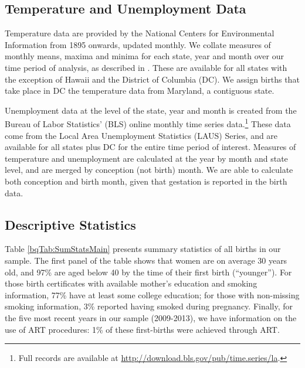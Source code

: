 \documentclass[a4paper, 11.5 pt]{article}
\theoremstyle{plain}
\begin{document}
\begin{doublespace}
\subsection{Temperature and Unemployment Data}
Temperature data are provided by the National Centers for Environmental Information from 1895 onwards, updated monthly. We collate measures of monthly means, maxima and minima for each state, year and month over our time period of analysis, as described in \citet{Voseetal2014}. These are available for all states with the exception of Hawaii and the District of Columbia (DC). We assign births that take place in DC the temperature data from Maryland, a contiguous state.

Unemployment data at the level of the state, year and month is created from the Bureau of Labor Statistics' (BLS) online monthly time series
data.\footnote{Full records are available at \href{http://download.bls.gov/pub/time.series/la}{http://download.bls.gov/pub/time.series/la}.} These data come from the Local
Area Unemployment Statistics (LAUS) Series, and are available for all states plus DC for the entire time period of interest. Measures of temperature and unemployment are calculated at the year by month and state level, and are merged by conception (not birth) month.  We are able to calculate both conception and birth month, given that gestation is reported in the birth data.




\subsection{Descriptive Statistics}


Table \ref{bqTab:SumStatsMain} presents summary statistics of all births in our sample. The first panel of the table shows that women are on average 30 years old, and 97\% are aged below 40 by the time of their first birth (``younger''). For those birth certificates with available mother's education and smoking information, 77\% have at least some college education; for those with non-missing smoking information, 3\% reported having smoked during pregnancy. Finally, for the five most recent years in our sample (2009-2013), we have information on the use of ART procedures: 1\% of these first-births were achieved through ART.


\end{doublespace}
\end{document}
